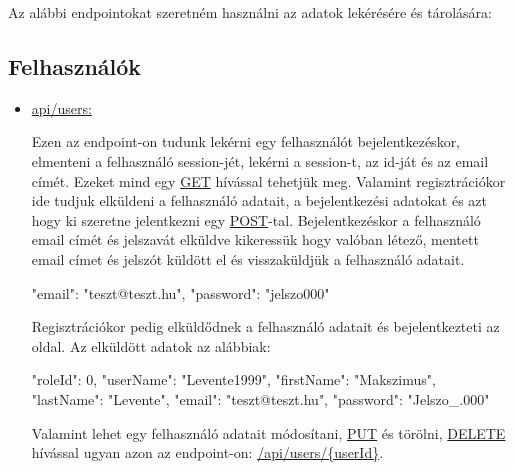 
Az alábbi endpointokat szeretném használni az adatok lekérésére és tárolására:
\subsection{Felhasználók}
\begin{itemize}[label={$\bullet$}, topsep=0pt, itemsep=0pt, leftmargin=15pt]
    \item[] {\url{api/users:}}
          \begin{addmargin}[\parindent]{0pt}
              Ezen az endpoint-on tudunk lekérni egy felhasználót bejelentkezéskor, elmenteni a felhasználó session-jét, lekérni a session-t, az id-ját és az email címét. Ezeket mind egy \url{GET} hívással tehetjük meg. Valamint regisztrációkor ide tudjuk elküldeni a felhasználó adatait, a bejelentkezési adatokat és azt hogy ki szeretne jelentkezni egy \url{POST}-tal. Bejelentkezéskor a felhasználó email címét és jelszavát elküldve kikeressük hogy valóban létező, mentett email címet és jelszót küldött el és visszaküldjük a felhasználó adatait.
              \begin{json}
{
    "email": "teszt@teszt.hu",
    "password": "jelszo000"
}
              \end{json}

              Regisztrációkor pedig elküldődnek a felhasználó adatait és bejelentkezteti az oldal. Az elküldött adatok az alábbiak:

              \begin{json}
{
    "roleId": 0,
    "userName": "Levente1999",
    "firstName": "Makszimus",
    "lastName": "Levente",
    "email": "teszt@teszt.hu",
    "password": "Jelszo_.000"
}
              \end{json}

              Valamint lehet egy felhasználó adatait módosítani, \url{PUT} és törölni, \url{DELETE} hívással ugyan azon az endpoint-on: \url{/api/users/{userId}}.
          \end{addmargin}
\end{itemize}

